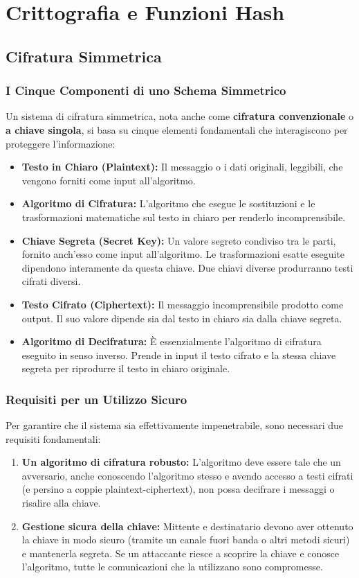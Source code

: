 \chapter{Crittografia e Funzioni Hash}

\section{Cifratura Simmetrica}
\subsection{I Cinque Componenti di uno Schema Simmetrico}
Un sistema di cifratura simmetrica, nota anche come \textbf{cifratura convenzionale} o \textbf{a chiave singola}, si basa su cinque elementi fondamentali che interagiscono per proteggere l'informazione:

\begin{itemize}
    \item \textbf{Testo in Chiaro (Plaintext):} Il messaggio o i dati originali, leggibili, che vengono forniti come input all'algoritmo.
    \item \textbf{Algoritmo di Cifratura:} L'algoritmo che esegue le sostituzioni e le trasformazioni matematiche sul testo in chiaro per renderlo incomprensibile.
    \item \textbf{Chiave Segreta (Secret Key):} Un valore segreto condiviso tra le parti, fornito anch'esso come input all'algoritmo. Le trasformazioni esatte eseguite dipendono interamente da questa chiave. Due chiavi diverse produrranno testi cifrati diversi.
    \item \textbf{Testo Cifrato (Ciphertext):} Il messaggio incomprensibile prodotto come output. Il suo valore dipende sia dal testo in chiaro sia dalla chiave segreta.
    \item \textbf{Algoritmo di Decifratura:} È essenzialmente l'algoritmo di cifratura eseguito in senso inverso. Prende in input il testo cifrato e la stessa chiave segreta per riprodurre il testo in chiaro originale.
\end{itemize}

\subsection{Requisiti per un Utilizzo Sicuro}
Per garantire che il sistema sia effettivamente impenetrabile, sono necessari due requisiti fondamentali:
\begin{enumerate}
    \item \textbf{Un algoritmo di cifratura robusto:} L'algoritmo deve essere tale che un avversario, anche conoscendo l'algoritmo stesso e avendo accesso a testi cifrati (e persino a coppie plaintext-ciphertext), non possa decifrare i messaggi o risalire alla chiave.
    \item \textbf{Gestione sicura della chiave:} Mittente e destinatario devono aver ottenuto la chiave in modo sicuro (tramite un canale fuori banda o altri metodi sicuri) e mantenerla segreta. Se un attaccante riesce a scoprire la chiave e conosce l'algoritmo, tutte le comunicazioni che la utilizzano sono compromesse.
\end{enumerate}

